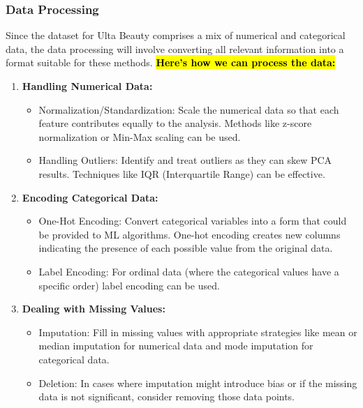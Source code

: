 \documentclass{article}
\begin{document}
\subsubsection{Data Processing}
\label{sec:data_processing}

Since the dataset for Ulta Beauty comprises a mix of numerical and categorical data, the data processing will involve converting all relevant information into a format suitable for these methods. \textbf{\hl{Here's how we can process the data:}}

\begin{enumerate}
    \item \textbf{Handling Numerical Data:}
    \begin{itemize}
        \item Normalization/Standardization: Scale the numerical data so that each feature contributes equally to the analysis. Methods like z-score normalization or Min-Max scaling can be used.
        \item Handling Outliers: Identify and treat outliers as they can skew PCA results. Techniques like IQR (Interquartile Range) can be effective.
    \end{itemize}
    
    \item \textbf{Encoding Categorical Data:}
    \begin{itemize}
        \item One-Hot Encoding: Convert categorical variables into a form that could be provided to ML algorithms. One-hot encoding creates new columns indicating the presence of each possible value from the original data.
        \item Label Encoding: For ordinal data (where the categorical values have a specific order) label encoding can be used.
    \end{itemize}
    
    \item \textbf{Dealing with Missing Values:}
    \begin{itemize}
        \item Imputation: Fill in missing values with appropriate strategies like mean or median imputation for numerical data and mode imputation for categorical data.
        \item Deletion: In cases where imputation might introduce bias or if the missing data is not significant, consider removing those data points.
    \end{itemize}


\end{enumerate}
\end{document}
